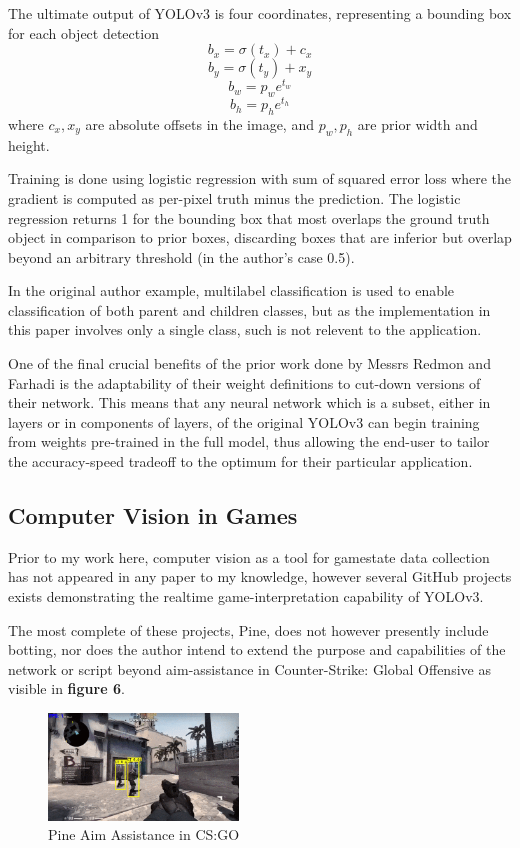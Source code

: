 \documentclass[sigconf]{acmart}
\begin{document}
The ultimate output of YOLOv3 is four coordinates, representing a bounding box for each object detection $$b_x=\sigma(t_x)+c_x$$ $$b_y=\sigma(t_y)+x_y$$ $$b_w=p_we^{t_w}$$ $$b_h=p_he^{t_h}$$ where $c_x,x_y$ are absolute offsets in the image, and $p_w,p_h$ are prior width and height.

Training is done using logistic regression with sum of squared error loss where the gradient is computed as per-pixel truth minus the prediction. The logistic regression returns 1 for the bounding box that most overlaps the ground truth object in comparison to prior boxes, discarding boxes that are inferior but overlap beyond an arbitrary threshold (in the author's case 0.5). \cite{YOLO}

In the original author example, multilabel classification is used to enable classification of both parent and children classes, but as the implementation in this paper involves only a single class, such is not relevent to the application. \cite{YOLO}

One of the final crucial benefits of the prior work done by Messrs Redmon and Farhadi is the adaptability of their weight definitions to cut-down versions of their network. This means that any neural network which is a subset, either in layers or in components of layers, of the original YOLOv3 can begin training from weights pre-trained in the full model, thus allowing the end-user to tailor the accuracy-speed tradeoff to the optimum for their particular application.\cite{YOLO}

\subsection{Computer Vision in Games}

Prior to my work here, computer vision as a tool for gamestate data collection has not appeared in any paper to my knowledge, however several GitHub projects exists demonstrating the realtime game-interpretation capability of YOLOv3. \cite{Pine}

The most complete of these projects, Pine, does not however presently include botting, nor does the author intend to extend the purpose and capabilities of the network or script beyond aim-assistance in Counter-Strike: Global Offensive as visible in \textbf{figure 6}. \cite{Pine}

\begin{figure}
  \includegraphics[width=0.45\textwidth]{csgo.png}
  \caption{Pine Aim Assistance in CS:GO}
  \label{fig:iterchart}
\end{figure}
\end{document}
